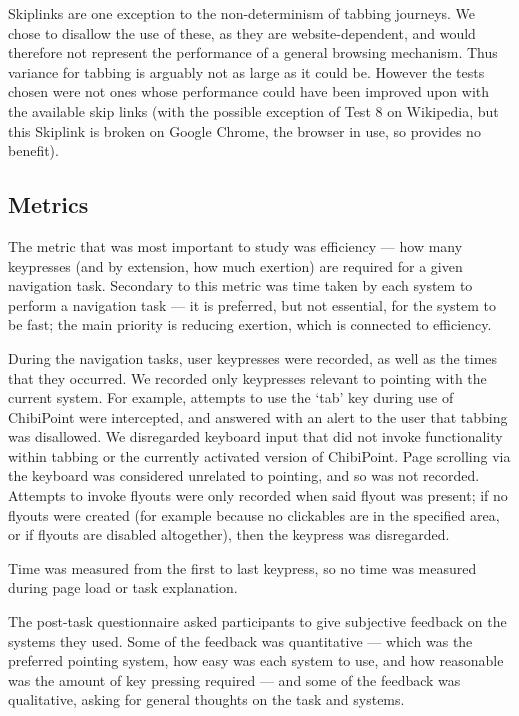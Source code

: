 \documentclass[a4paper, 12pt]{report}
\begin{document}
Skiplinks are one exception to the non-determinism of tabbing journeys. We chose to disallow the use of these, as they are website-dependent, and would therefore not represent the performance of a general browsing mechanism. Thus variance for tabbing is arguably not as large as it could be. However the tests chosen were not ones whose performance could have been improved upon with the available skip links (with the possible exception of Test 8 on Wikipedia, but this Skiplink is broken on Google Chrome, the browser in use, so provides no benefit).

\subsection{Metrics}
The metric that was most important to study was efficiency --- how many keypresses (and by extension, how much exertion) are required for a given navigation task. Secondary to this metric was time taken by each system to perform a navigation task --- it is preferred, but not essential, for the system to be fast; the main priority is reducing exertion, which is connected to efficiency.

During the navigation tasks, user keypresses were recorded, as well as the times that they occurred. We recorded only keypresses relevant to pointing with the current system. For example, attempts to use the `tab' key during use of ChibiPoint were intercepted, and answered with an alert to the user that tabbing was disallowed. We disregarded keyboard input that did not invoke functionality within tabbing or the currently activated version of ChibiPoint. Page scrolling via the keyboard was considered unrelated to pointing, and so was not recorded. Attempts to invoke flyouts were only recorded when said flyout was present; if no flyouts were created (for example because no clickables are in the specified area, or if flyouts are disabled altogether), then the keypress was disregarded.

Time was measured from the first to last keypress, so no time was measured during page load or task explanation.

The post-task questionnaire asked participants to give subjective feedback on the systems they used. Some of the feedback was quantitative --- which was the preferred pointing system, how easy was each system to use, and how reasonable was the amount of key pressing required --- and some of the feedback was qualitative, asking for general thoughts on the task and systems.
\end{document}
